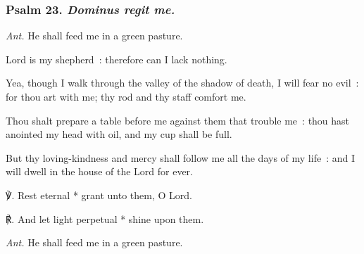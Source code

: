 \subsubsection{Psalm 23. \textit{Dominus regit me.}}\par\noindent
\textit{Ant.} He shall feed me {\dag} in a green pasture.\par
{} Lord is my shepherd~: therefore can I lack nothing.\par
{}
Yea, though I walk through the valley of the shadow of death, I will fear no evil~: for thou art with me; thy rod and thy staff comfort me.\par
{}Thou shalt prepare a table before me against them that trouble me~: thou hast anointed my head with oil, and my cup shall be full.\par
{}But thy loving-kindness and mercy shall follow me all the days of my life~: and I will dwell in the house of the Lord for ever.\par
℣. Rest eternal * grant unto them, O Lord.\par
℟. And let light perpetual * shine upon them.\par\noindent
\textit{Ant.} He shall feed me in a green pasture.

